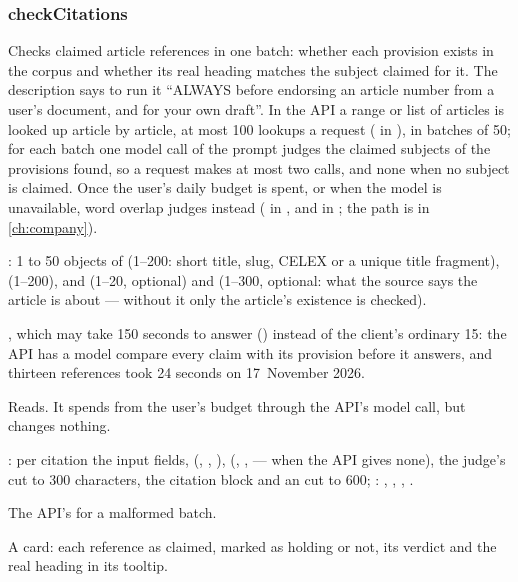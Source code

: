 \subsubsection{checkCitations}\label{sec:tools:checkCitations}
\begin{description}[style=multiline, leftmargin=19mm, labelwidth=17mm, labelsep=2mm,
  font=\sffamily\bfseries\footnotesize\color{ink}, itemsep=1pt, topsep=2pt, before=\raggedright]
  \item[Does] Checks claimed article references in one batch: whether each provision exists
    in the corpus and whether its real heading matches the subject claimed for it. The
    description says to run it \enquote{ALWAYS before endorsing an article number from a
    user's document, and for your own draft}. In the API a range or list of articles is looked
    up article by article, at most 100 lookups a request ( in
    ), in batches of 50; for each batch one model call of the prompt
     judges the claimed subjects of the provisions found, so a
    request makes at most two calls, and none when no subject is claimed. Once the user's
    daily budget is spent, or when the model is unavailable, word overlap judges instead
    ( in ,  and
     in ; the path is in \cref{ch:company}).
  \item[Input] : 1 to 50 objects of  (1--200: short title, slug,
    CELEX or a unique title fragment),  (1--200),  and
     (1--20, optional) and  (1--300, optional: what the source
    says the article is about --- without it only the article's existence is checked).
  \item[Calls] , which may take 150 seconds to answer
    () instead of the client's ordinary 15: the API has a model compare
    every claim with its provision before it answers, and thirteen references took 24
    seconds on 17~November 2026.
  \item[Kind] Reads. It spends from the user's budget through the API's model call, but
    changes nothing.
  \item[Returns] : per citation the input fields, 
    (, , ), 
    (, ,  ---  when the API gives none),
    the judge's  cut to 300 characters, the citation block and an  cut
    to 600; : , , ,
    .
  \item[Errors] The API's  for a malformed batch.
  \item[Console] A card: each reference as claimed, marked as holding or not, its verdict and
    the real heading in its tooltip.
\end{description}

